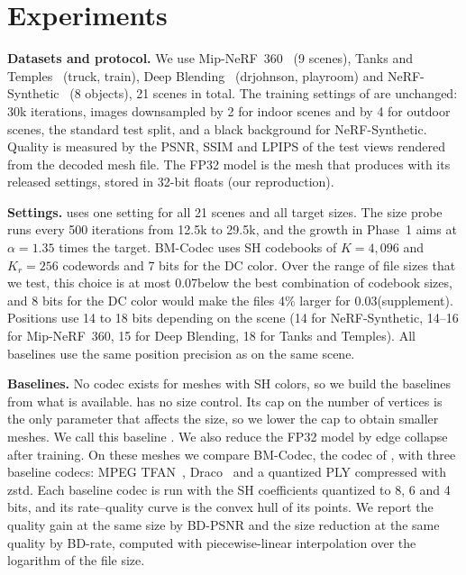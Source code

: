 \section{Experiments}
\label{sec:exp}

\noindent\textbf{Datasets and protocol.} We use Mip-NeRF~360~\cite{barron2022mipnerf360} (9 scenes), Tanks and Temples~\cite{knapitsch2017tanks} (truck, train), Deep Blending~\cite{hedman2018deep} (drjohnson, playroom) and NeRF-Synthetic~\cite{mildenhall2020nerf} (8 objects), 21 scenes in total. The training settings of \MS are unchanged: 30k iterations, images downsampled by 2 for indoor scenes and by 4 for outdoor scenes, the standard test split, and a black background for NeRF-Synthetic. Quality is measured by the PSNR, SSIM and LPIPS of the test views rendered from the decoded mesh file. The FP32 model is the mesh that \MS produces with its released settings, stored in 32-bit floats (our reproduction).

\noindent\textbf{Settings.} \BM uses one setting for all 21 scenes and all target sizes. The size probe runs every 500 iterations from 12.5k to 29.5k, and the growth in Phase~1 aims at $\alpha = 1.35$ times the target. BM-Codec uses SH codebooks of $K = 4{,}096$ and $K_r = 256$ codewords and 7 bits for the DC color. Over the range of file sizes that we test, this choice is at most 0.07\dB below the best combination of codebook sizes, and 8 bits for the DC color would make the files 4\% larger for 0.03\dB (supplement). Positions use 14 to 18 bits depending on the scene (14 for NeRF-Synthetic, 14--16 for Mip-NeRF~360, 15 for Deep Blending, 18 for Tanks and Temples). All baselines use the same position precision as \BM on the same scene.

\noindent\textbf{Baselines.} No codec exists for meshes with SH colors, so we build the baselines from what is available. \MS has no size control. Its cap on the number of vertices is the only parameter that affects the size, so we lower the cap to obtain smaller meshes. We call this baseline \MSc. We also reduce the FP32 model by edge collapse after training. On these meshes we compare BM-Codec, the codec of \BM, with three baseline codecs: MPEG TFAN~\cite{mamou2009tfan}, Draco~\cite{draco} and a quantized PLY compressed with zstd. Each baseline codec is run with the SH coefficients quantized to 8, 6 and 4 bits, and its rate--quality curve is the convex hull of its points. We report the quality gain at the same size by BD-PSNR and the size reduction at the same quality by BD-rate, computed with piecewise-linear interpolation over the logarithm of the file size.

